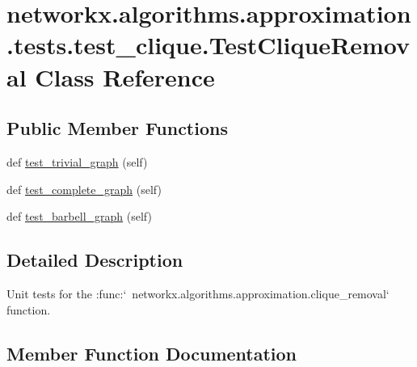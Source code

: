 \hypertarget{classnetworkx_1_1algorithms_1_1approximation_1_1tests_1_1test__clique_1_1TestCliqueRemoval}{}\section{networkx.\+algorithms.\+approximation.\+tests.\+test\+\_\+clique.\+Test\+Clique\+Removal Class Reference}
\label{classnetworkx_1_1algorithms_1_1approximation_1_1tests_1_1test__clique_1_1TestCliqueRemoval}
\subsection*{Public Member Functions}
\begin{DoxyCompactItemize}
\item 
def \hyperlink{classnetworkx_1_1algorithms_1_1approximation_1_1tests_1_1test__clique_1_1TestCliqueRemoval_afa82768df80948031d57940bd54609ee}{test\+\_\+trivial\+\_\+graph} (self)
\item 
def \hyperlink{classnetworkx_1_1algorithms_1_1approximation_1_1tests_1_1test__clique_1_1TestCliqueRemoval_a0963d8624ff9f4a5a318cd07ca493e37}{test\+\_\+complete\+\_\+graph} (self)
\item 
def \hyperlink{classnetworkx_1_1algorithms_1_1approximation_1_1tests_1_1test__clique_1_1TestCliqueRemoval_a046fff2bb498a2cdc6a354cf3b810466}{test\+\_\+barbell\+\_\+graph} (self)
\end{DoxyCompactItemize}


\subsection{Detailed Description}
\begin{DoxyVerb}Unit tests for the
:func:`~networkx.algorithms.approximation.clique_removal` function.\end{DoxyVerb}
 

\subsection{Member Function Documentation}
\mbox{\label{classnetworkx_1_1algorithms_1_1approximation_1_1tests_1_1test__clique_1_1TestCliqueRemoval_a046fff2bb498a2cdc6a354cf3b810466}} 
